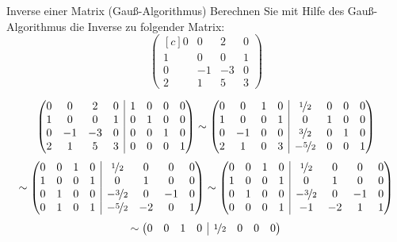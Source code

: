 \documentclass[german]{../spicker}
\makeatletter
\newcommand{\vektor}[1]{\begin{pmatrix*}[c] #1 \end{pmatrix*}}
\newenvironment{sysmatrix}[1]
 {\left(\begin{array}{@{}#1@{}}}
 {\end{array}\right)}
\makeatother
\begin{document}
\begin{example}{Inverse einer Matrix (Gauß-Algorithmus)}
    Berechnen Sie mit Hilfe des Gauß-Algorithmus die Inverse zu folgender Matrix:
    $$\vektor{0 & 0 & 2 & 0 \\ 1 & 0 & 0 & 1 \\ 0 & -1 & -3 & 0 \\ 2 & 1 & 5 & 3}$$

    \exampleseparator

    $$
        \begin{sysmatrix}{cccr|cccr}
            0 & 0 & 2 & 0   & 1 & 0 & 0 & 0 \\
            1 & 0 & 0 & 1   & 0 & 1 & 0 & 0 \\
            0 & -1 & -3 & 0 & 0 & 0 & 1 & 0 \\
            2 & 1 & 5 & 3   & 0 & 0 & 0 & 1
        \end{sysmatrix}
        \sim
        \begin{sysmatrix}{cccr|cccr}
            0 & 0 & 1 & 0   & \nicefrac{1}{2} & 0 & 0 & 0 \\
            1 & 0 & 0 & 1   & 0 & 1 & 0 & 0 \\
            0 & -1 & 0 & 0 & \nicefrac{3}{2} & 0 & 1 & 0 \\
            2 & 1 & 0 & 3   & -\nicefrac{5}{2} & 0 & 0 & 1
        \end{sysmatrix}
    $$
    $$
        \sim
        \begin{sysmatrix}{cccr|cccr}
            0 & 0 & 1 & 0   & \nicefrac{1}{2} & 0 & 0 & 0 \\
            1 & 0 & 0 & 1   & 0 & 1 & 0 & 0 \\
            0 & 1 & 0 & 0 & -\nicefrac{3}{2} & 0 & -1 & 0 \\
            0 & 1 & 0 & 1   & -\nicefrac{5}{2} & -2 & 0 & 1
        \end{sysmatrix}
        \sim
        \begin{sysmatrix}{cccr|cccr}
            0 & 0 & 1 & 0   & \nicefrac{1}{2} & 0 & 0 & 0 \\
            1 & 0 & 0 & 1   & 0 & 1 & 0 & 0 \\
            0 & 1 & 0 & 0 & -\nicefrac{3}{2} & 0 & -1 & 0 \\
            0 & 0 & 0 & 1   & -1 & -2 & 1 & 1
        \end{sysmatrix}
    $$
    $$
        \sim
        \begin{sysmatrix}{cccr|cccr}
            0 & 0 & 1 & 0   & \nicefrac{1}{2} & 0 & 0 & 0 \\

\end{sysmatrix}$$
\end{example}
\end{document}
